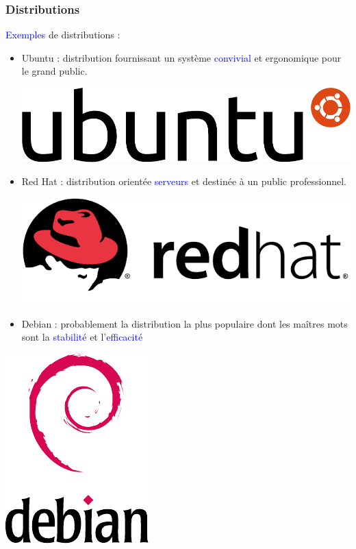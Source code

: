 \documentclass[aspectratio=169]{beamer}
\begin{document}
\begin{frame}
\frametitle{Distributions}
\textcolor{blue}{Exemples} de distributions : \\

\begin{itemize}
  \item Ubuntu : distribution fournissant un système \textcolor{blue}{convivial}
  et ergonomique pour le grand public.

\begin{center}
    \includegraphics[scale=0.1]
    {textures/images/unix/logos/ubuntu.pdf}
  \end{center}

    \item Red Hat : distribution orientée \textcolor{blue}{serveurs} et destinée
    à un public professionnel.

\begin{center}
    \includegraphics[scale=0.2]
    {textures/images/unix/logos/redhat.pdf}
  \end{center}

      \item Debian : probablement la distribution la plus populaire dont les
maîtres mots sont la \textcolor{blue}{stabilité} et
l'\textcolor{blue}{efficacité}
\end{itemize}

\begin{center}
    \includegraphics[scale=0.3]
    {textures/images/unix/logos/debian.pdf}
\end{center}

\end{frame}
\end{document}
